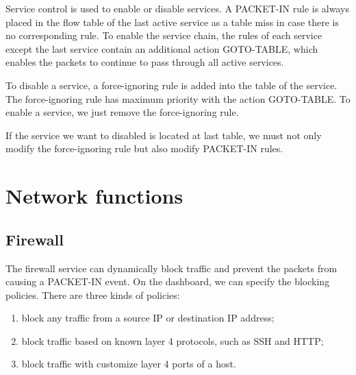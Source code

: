 

Service control is used to enable or disable services.
A PACKET-IN rule is always placed in the flow table of the last active service as a table miss in case there is no corresponding rule.
To enable the service chain, the rules of each service except the last service contain an additional action GOTO-TABLE, which enables the packets to continue to pass through all active services.

To disable a service, a force-ignoring rule is added into the table of the service.
The force-ignoring rule has maximum priority with the action GOTO-TABLE.
To enable a service, we just remove the force-ignoring rule.

If the service we want to disabled is located at last table, we must not only modify the force-ignoring rule but also modify PACKET-IN rules.


\section{Network functions} \label{sec:setwork_functions}
\subsection{Firewall}
The firewall service can dynamically block traffic and prevent the packets from causing a PACKET-IN event.
On the dashboard, we can specify the blocking policies. There are three kinds of policies:
\begin{enumerate}[leftmargin=4em]
  \item block any traffic from a source IP or destination IP address;
  \item block traffic based on known layer 4 protocols, such as SSH and HTTP;
  \item block traffic with customize layer 4 ports of a host.
\end{enumerate}

